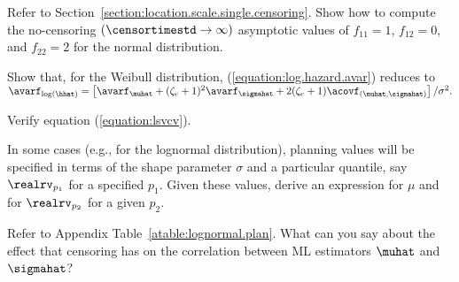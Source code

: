 \begin{exercise1}
Refer to Section~\ref{section:location.scale.single.censoring}.
Show how to compute the no-censoring $(\censortimestd \rightarrow
\infty)$
asymptotic values of $f_{11}=1$, $f_{12}=0$, and $f_{22}=2$ for the normal
distribution.
\end{exercise1}

\begin{exercise1}
Show that, for the Weibull distribution,
(\ref{equation:log.hazard.avar}) reduces to
$
\avarf_{\log(\hhat)} =
        \left [   \avarf_{\muhat} + (\zeta_{e} +
1)^2\avarf_{\sigmahat} + 2(\zeta_{e} +
1) \acovf_{(\muhat,\sigmahat)} \right ]/\sigma^{2}.
$
\end{exercise1}

\begin{exercise}
Verify equation (\ref{equation:lsvcv}).
\end{exercise}

\begin{exercise}
In some cases (e.g., for the lognormal distribution), planning values
will be specified in terms of the shape parameter
$\sigma$ and a particular quantile, say $\realrv_{p_{1}}$ for a
specified $p_{1}$.  Given these values, derive an expression for $\mu$
and for $\realrv_{p_{2}}$ for a given $p_{2}$.
\end{exercise}

\begin{exercise}
Refer to Appendix Table~\ref{atable:lognormal.plan}. 
What can you say about the effect that censoring has
on the correlation between ML estimators $\muhat$ and $\sigmahat$?
\end{exercise}
